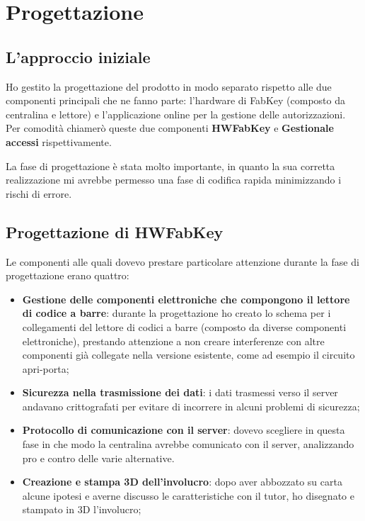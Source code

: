 \section{Progettazione}
\subsection{L'approccio iniziale}
Ho gestito la progettazione del prodotto in modo separato rispetto alle due componenti principali che ne fanno parte: l'hardware di FabKey (composto da centralina e lettore) e l'applicazione online per la gestione delle autorizzazioni. Per comodità chiamerò queste due componenti \textbf{HWFabKey} e \textbf{Gestionale accessi} rispettivamente.

\medskip

La fase di progettazione è stata molto importante, in quanto la sua corretta realizzazione mi avrebbe permesso una fase di codifica rapida minimizzando i rischi di errore.

\bigskip

\subsection{Progettazione di HWFabKey}

Le componenti alle quali dovevo prestare particolare attenzione durante la fase di progettazione erano quattro:
\begin{itemize}
\item \textbf{Gestione delle componenti elettroniche che compongono il lettore di codice a barre}: durante la progettazione ho creato lo schema per i collegamenti del lettore di codici a barre (composto da diverse componenti elettroniche), prestando attenzione a non creare interferenze con altre componenti già collegate nella versione esistente, come ad esempio il circuito apri-porta;
\item \textbf{Sicurezza nella trasmissione dei dati}: i dati trasmessi verso il server andavano crittografati per evitare di incorrere in alcuni problemi di sicurezza;
\item \textbf{Protocollo di comunicazione con il server}: dovevo scegliere in questa fase in che modo la centralina avrebbe comunicato con il server, analizzando pro e contro delle varie alternative.
\item \textbf{Creazione e stampa 3D dell'involucro}: dopo aver abbozzato su carta alcune ipotesi e averne discusso le caratteristiche con il tutor, ho disegnato e stampato in 3D l'involucro;
\end{itemize}

